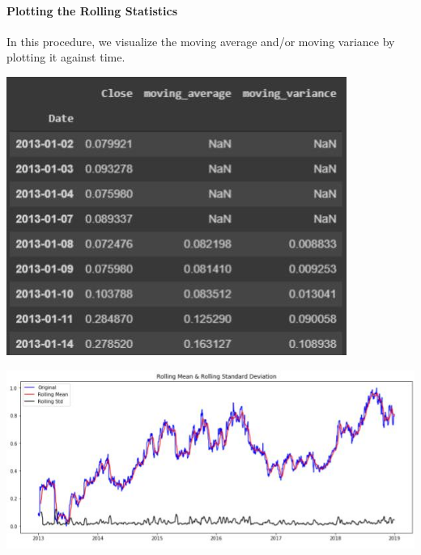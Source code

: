 		\paragraph{Plotting the Rolling Statistics}

			In this procedure, we visualize the moving average and/or moving variance by plotting it against time.

		\begin{center}
		\includegraphics[width=\linewidth]{figures/Moving-Average-and-Moving-Variance.jpg}	
		\label{fig: Moving Average and Moving Variance of the Closing Price with window size = 5}
		\end{center}

		\begin{center}
		\includegraphics[width=\linewidth]{figures/Plot-of-the-Rolling-Mean-and-the-Rolling-Standard-Deviation.jpg}	
		\label{fig: Plot of the Rolling Mean and the Rolling Standard Deviation of Moving Average of Closing Price}
		\end{center}
	
